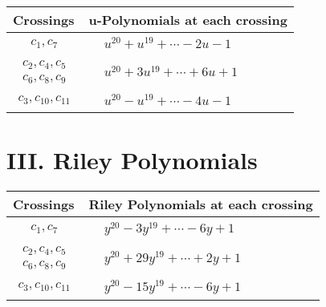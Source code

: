 \documentclass[1p]{elsarticle_modified}
\theoremstyle{definition}
\begin{document}
\begin{tabular}{m{50pt}|m{274pt}}
Crossings & \hspace{64pt}u-Polynomials at each crossing \\
\hline $$\begin{aligned}c_{1},c_{7}\end{aligned}$$&$\begin{aligned}
&u^{20}+u^{19}+\cdots-2 u-1
\end{aligned}$\\
\hline $$\begin{aligned}c_{2},c_{4},c_{5}\\c_{6},c_{8},c_{9}\end{aligned}$$&$\begin{aligned}
&u^{20}+3 u^{19}+\cdots+6 u+1
\end{aligned}$\\
\hline $$\begin{aligned}c_{3},c_{10},c_{11}\end{aligned}$$&$\begin{aligned}
&u^{20}- u^{19}+\cdots-4 u-1
\end{aligned}$\\
\hline
\end{tabular}\newpage\renewcommand{\arraystretch}{1}
\centering \section*{ III. Riley Polynomials}
\begin{tabular}{m{50pt}|m{274pt}}
Crossings & \hspace{64pt}Riley Polynomials at each crossing \\
\hline $$\begin{aligned}c_{1},c_{7}\end{aligned}$$&$\begin{aligned}
&y^{20}-3 y^{19}+\cdots-6 y+1
\end{aligned}$\\
\hline $$\begin{aligned}c_{2},c_{4},c_{5}\\c_{6},c_{8},c_{9}\end{aligned}$$&$\begin{aligned}
&y^{20}+29 y^{19}+\cdots+2 y+1
\end{aligned}$\\
\hline $$\begin{aligned}c_{3},c_{10},c_{11}\end{aligned}$$&$\begin{aligned}
&y^{20}-15 y^{19}+\cdots-6 y+1
\end{aligned}$\\
\hline
\end{tabular}
\vskip 2pc
\end{document}
